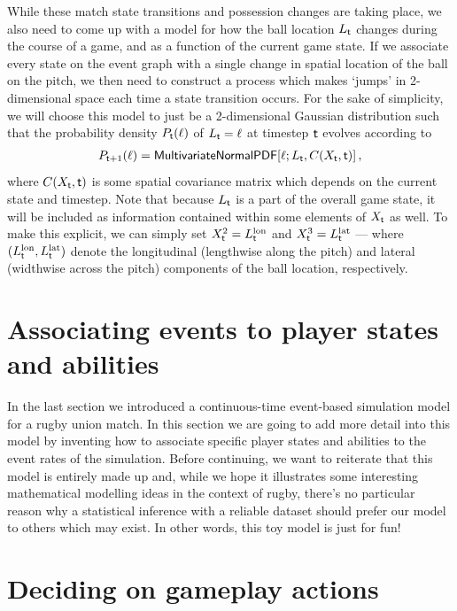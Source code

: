 While these match state transitions and possession changes are taking place, we also need to come up with a model for how the ball location $L_{{\sf t}}$ changes during the course of a game, and as a function of the current game state. If we associate every state on the event graph with a single change in spatial location of the ball on the pitch, we then need to construct a process which makes `jumps' in 2-dimensional space each time a state transition occurs. For the sake of simplicity, we will choose this model to just be a 2-dimensional Gaussian distribution such that the probability density $P_{{\sf t}}(\ell )$ of $L_{{\sf t}}=\ell$ at timestep ${\sf t}$ evolves according to
\begin{align}
P_{{\sf t}+1}(\ell ) = {\sf MultivariateNormalPDF}[\ell ; L_{{\sf t}}, C(X_{{\sf t}}, {\sf t})] \,,
\end{align}
where $C(X_{{\sf t}}, {\sf t})$ is some spatial covariance matrix which depends on the current state and timestep. Note that because $L_{{\sf t}}$ is a part of the overall game state, it will be included as information contained within some elements of $X_{{\sf t}}$ as well. To make this explicit, we can simply set $X^2_{{\sf t}}=L^{\rm lon}_{{\sf t}}$ and $X^3_{{\sf t}}=L^{\rm lat}_{{\sf t}}$ --- where $(L^{\rm lon}_{{\sf t}}, L^{\rm lat}_{{\sf t}})$ denote the longitudinal (lengthwise along the pitch) and lateral (widthwise across the pitch) components of the ball location, respectively.

\section{\sffamily Associating events to player states and abilities}

In the last section we introduced a continuous-time event-based simulation model for a rugby union match. In this section we are going to add more detail into this model by inventing how to associate specific player states and abilities to the event rates of the simulation. Before continuing, we want to reiterate that this model is entirely made up and, while we hope it illustrates some interesting mathematical modelling ideas in the context of rugby, there's no particular reason why a statistical inference with a reliable dataset should prefer our model to others which may exist. In other words, this toy model is just for fun!

\section{\sffamily Deciding on gameplay actions}


